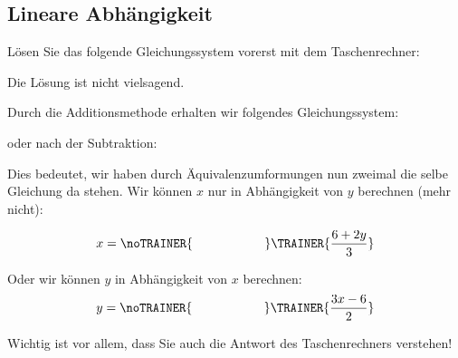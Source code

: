 \subsection{Lineare Abhängigkeit}

Lösen Sie das folgende Gleichungssystem vorerst mit dem
Taschenrechner:


Die Lösung ist nicht vielsagend.

Durch die Additionsmethode erhalten wir folgendes Gleichungssystem:


oder nach der Subtraktion:


Dies bedeutet, wir haben durch Äquivalenzumformungen nun zweimal die selbe
Gleichung da stehen. Wir können $x$ nur in Abhängigkeit von $y$
berechnen (mehr nicht):

$$x=\noTRAINER{\hspace{20mm}}\TRAINER{\frac{6+2y}{3}}$$

Oder wir können $y$ in Abhängigkeit von $x$ berechnen:
$$y=\noTRAINER{\hspace{20mm}}\TRAINER{\frac{3x-6}{2}}$$

Wichtig ist vor allem, dass Sie auch die Antwort des Taschenrechners verstehen!
